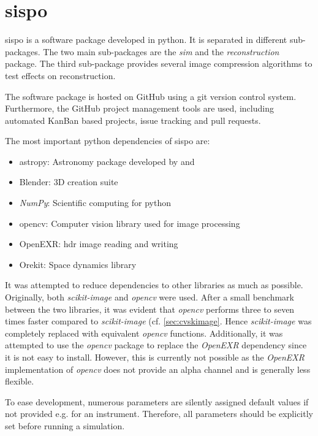 \section{\Acrlong{sispo}} \label{sec:sispo}

\gls{sispo} is a software package developed in python. It is separated in different sub-packages. The two main sub-packages are the \textit{sim} and the \textit{reconstruction} package. The third sub-package provides several image compression algorithms to test effects on reconstruction.

The software package is hosted on GitHub using a git version control system. Furthermore, the GitHub project management tools are used, including automated KanBan based projects, issue tracking and pull requests.

The most important python dependencies of \gls{sispo} are:
\begin{itemize}
    \item astropy: Astronomy package developed by \cite{robitaille2013astropy} and \cite{price2018astropy}
    \item Blender: 3D creation suite
    \item \textit{NumPy}: Scientific computing for python
    \item opencv: Computer vision library used for image processing
    \item OpenEXR: \gls{hdr} image reading and writing
    \item Orekit: Space dynamics library
\end{itemize}

It was attempted to reduce dependencies to other libraries as much as possible. Originally, both \textit{scikit-image} and \textit{opencv} were used. After a small benchmark between the two libraries, it was evident that \textit{opencv} performs three to seven times faster compared to \textit{scikit-image} (cf. \ref{sec:cvskimage}. Hence \textit{scikit-image} was completely replaced with equivalent \textit{opencv} functions. Additionally, it was attempted to use the \textit{opencv} package to replace the \textit{OpenEXR} dependency since it is not easy to install. However, this is currently not possible as the \textit{OpenEXR} implementation of \textit{opencv} does not provide an alpha channel and is generally less flexible.

To ease development, numerous parameters are silently assigned default values if not provided e.g. for an instrument. Therefore, all parameters should be explicitly set before running a simulation.

